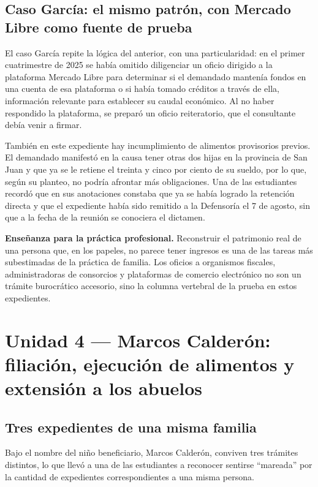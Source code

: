 \documentclass[12pt,oneside]{book}
\begin{document}
\subsection{Caso García: el mismo patrón, con Mercado Libre como fuente de prueba}

El caso García repite la lógica del anterior, con una particularidad: en el primer cuatrimestre de 2025 se había omitido diligenciar un oficio dirigido a la plataforma Mercado Libre para determinar si el demandado mantenía fondos en una cuenta de esa plataforma o si había tomado créditos a través de ella, información relevante para establecer su caudal económico. Al no haber respondido la plataforma, se preparó un oficio reiteratorio, que el consultante debía venir a firmar.

También en este expediente hay incumplimiento de alimentos provisorios previos. El demandado manifestó en la causa tener otras dos hijas en la provincia de San Juan y que ya se le retiene el treinta y cinco por ciento de su sueldo, por lo que, según su planteo, no podría afrontar más obligaciones. Una de las estudiantes recordó que en sus anotaciones constaba que ya se había logrado la retención directa y que el expediente había sido remitido a la Defensoría el 7 de agosto, sin que a la fecha de la reunión se conociera el dictamen.

\begin{note}
\textbf{Enseñanza para la práctica profesional.} Reconstruir el patrimonio real de una persona que, en los papeles, no parece tener ingresos es una de las tareas más subestimadas de la práctica de familia. Los oficios a organismos fiscales, administradoras de consorcios y plataformas de comercio electrónico no son un trámite burocrático accesorio, sino la columna vertebral de la prueba en estos expedientes.
\end{note}

\section{Unidad 4 --- Marcos Calderón: filiación, ejecución de alimentos y extensión a los abuelos}

\subsection{Tres expedientes de una misma familia}

Bajo el nombre del niño beneficiario, Marcos Calderón, conviven tres trámites distintos, lo que llevó a una de las estudiantes a reconocer sentirse ``mareada'' por la cantidad de expedientes correspondientes a una misma persona.
\end{document}
